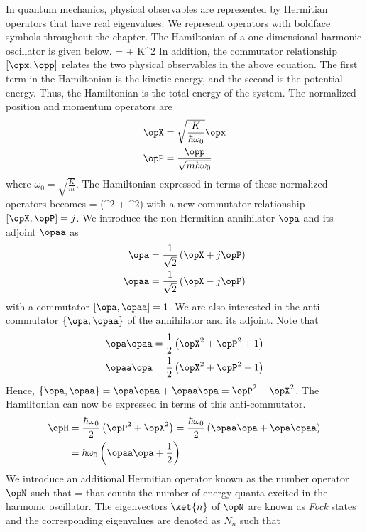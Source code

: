 In quantum mechanics, physical observables are represented by Hermitian operators that have real eigenvalues. We represent operators with boldface symbols throughout the chapter. The Hamiltonian of a one-dimensional harmonic oscillator is given below.
\beq
\opH =  + K\opx^2
\eeq
In addition, the commutator relationship $[\opx,\opp]$ relates the two physical observables in the above equation. The first term in the Hamiltonian is the kinetic energy, and the second is the potential energy. Thus, the Hamiltonian is the total energy of the system. The normalized position and momentum operators are
\begin{align}
\opX &= \sqrt{\frac{K}{\hbar\omega_0}}\opx\\
\opP &= \frac{\opp}{\sqrt{m\hbar\omega_0}}
\end{align}
where $\omega_0 = \sqrt{\frac{K}{m}}$. The Hamiltonian expressed in terms of these normalized operators becomes
\beq
\opH = \left(\opP^2 + \opX^2\right)
\eeq
with a new commutator relationship $[\opX,\opP] = j$. We introduce the non-Hermitian annihilator $\opa$ and its adjoint $\opaa$ as
\begin{align}
\label{eq:acdef}
\opa &= \frac{1}{\sqrt{2}}\left(\opX + j\opP\right)\\
\opaa &= \frac{1}{\sqrt{2}}\left(\opX - j\opP\right)
\end{align}
with a commutator $[\opa,\opaa]=1$. We are also interested in the anti-commutator $\{\opa,\opaa\}$ of the annihilator and its adjoint. Note that
\begin{align}
\opa\opaa &= \frac{1}{2}\left(\opX^2+\opP^2+1\right)\\
\opaa\opa &= \frac{1}{2}\left(\opX^2+\opP^2-1\right)
\end{align}
Hence, $\{\opa,\opaa\} = \opa\opaa+\opaa\opa = \opP^2 + \opX^2$. The Hamiltonian can now be expressed in terms of this anti-commutator.
\begin{align}
\opH &= \frac{\hbar\omega_0}{2}\left(\opP^2 + \opX^2\right) = \frac{\hbar\omega_0}{2}\left(\opaa\opa + \opa\opaa\right)\\
&= \hbar\omega_0\left(\opaa\opa + \frac{1}{2}\right)
\end{align}
We introduce an additional Hermitian operator known as the number operator $\opN$ such that
\beq
\opN = \opaa\opa
\eeq
that counts the number of energy quanta excited in the harmonic oscillator. The eigenvectors $\ket{n}$ of $\opN$ are known as \textit{Fock} states and the corresponding eigenvalues are denoted as $N_n$ such that
